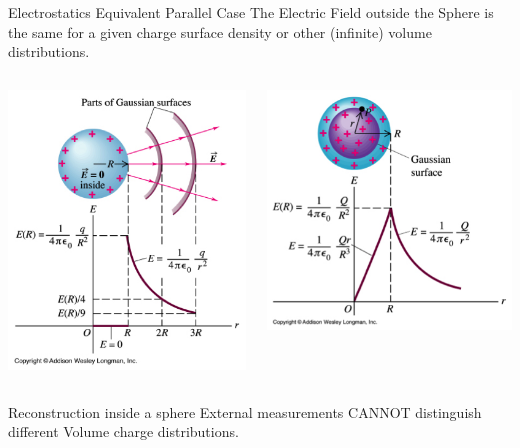 \documentclass{beamer}
\begin{document}
 \begin{frame}{Electrostatics Equivalent Parallel Case }
 The Electric Field outside the Sphere is the same for a given charge surface  density
or other (infinite) volume  distributions.
 \begin{columns}
	\begin{center}
	\includegraphics[width=.5\columnwidth]{surfcharge.png}
	\end{center}
	\begin{center}
	\includegraphics[width=.5\columnwidth]{volcharge.png}
	\end{center}

\end{columns}

 \begin{block}{Reconstruction inside a sphere }
	External  measurements  CANNOT distinguish different Volume charge distributions.
\end{block}
\end{frame}
\end{document}
